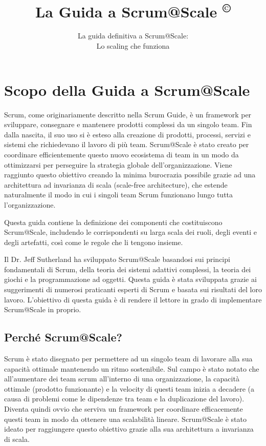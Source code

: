 \documentclass[12pt,a4paper,parskip=full]{scrartcl}
\title{\Huge{\color{red}\textbf{La Guida a Scrum@Scale
\textsuperscript{\copyright}
}}}
\subtitle{\color{gray}La guida definitiva a Scrum@Scale:\\ Lo scaling che funziona}
\date{}
\begin{document}

\section{Scopo della Guida a Scrum@Scale}
Scrum, come originariamente descritto nella Scrum Guide, è un 
framework per sviluppare, consegnare e mantenere prodotti complessi da 
un singolo team. Fin dalla nascita, il suo uso si è esteso alla creazione di 
prodotti, processi, servizi e sistemi che richiedevano il lavoro di più team.
Scrum@Scale è stato creato per coordinare efficientemente questo nuovo 
ecosistema di team in un modo da ottimizzarsi per perseguire la strategia 
globale dell'organizzazione. Viene raggiunto questo obiettivo creando la 
minima burocrazia possibile grazie ad una architettura ad invarianza di scala 
(scale-free architecture), che estende naturalmente il modo in cui i singoli 
team Scrum funzionano lungo tutta l'organizzazione.

Questa guida contiene la definizione dei componenti che costituiscono Scrum@Scale, includendo le corrispondenti su larga scala dei ruoli, degli eventi e degli artefatti, così come le regole che li tengono insieme.

Il Dr. Jeff Sutherland ha sviluppato Scrum@Scale basandosi sui principi fondamentali di Scrum, della teoria dei sistemi adattivi complessi, la teoria dei giochi e la programmazione ad oggetti. Questa guida è stata sviluppata grazie ai suggerimenti di numerosi praticanti esperti di Scrum e basata sui risultati del loro lavoro. L'obiettivo di questa guida è di rendere il lettore in grado di implementare Scrum@Scale in proprio.

\subsection{Perché Scrum@Scale?}
Scrum è stato disegnato per permettere ad un singolo team di lavorare 
alla sua capacità ottimale mantenendo un ritmo sostenibile. Sul campo è
stato notato che all'aumentare dei team scrum all'interno di una organizzazione,
la capacità ottimale (prodotto funzionante) e la velocity di questi team inizia a
decadere (a causa di problemi come le dipendenze tra team e la duplicazione
del lavoro). Diventa quindi ovvio che serviva un framework per coordinare 
efficacemente questi team in modo da ottenere una scalabilità lineare.
Scrum@Scale è stato ideato per raggiungere questo obiettivo grazie alla
sua architettura a invarianza di scala.
\end{document}
